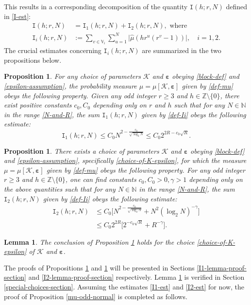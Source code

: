 \documentclass[12pt, twoside]{article}
\newtheorem{lemma}[theorem]{Lemma}
\newtheorem{proposition}[theorem]{Proposition}
\theoremstyle{definition}
\numberwithin{equation}{section}
\begin{document}
This results in a corresponding decomposition of the quantity $\mathtt I(h;r, N)$ defined in \eqref{I-est}: 
\begin{align} 
\mathtt I(h; r, N) &= \mathtt I_1(h; r, N) + \mathtt I_2(h;r, N), \text{ where } \label{I-decomp} \\ 
\mathtt I_i(h;r, N) &:=  \sum_{v \in \mathbb V_i} \sum_{u=1}^{N}\bigl| \widehat{\mu}(hr^u(r^v-1)) \bigr|, \quad i=1,2. \label{def-Ii}
\end{align} 
The crucial estimates concerning $\mathtt I_i(h;r, N)$ are summarized in the two propositions below. 
\begin{proposition} \label{Ii-lemma-parta}
For any choice of parameters $\mathcal K$ and $\pmb{\varepsilon}$ obeying \eqref{block-def} and \eqref{epsilon-assumption}, the probability measure $\mu = \mu[\mathcal K, \pmb{\varepsilon}]$ given by \eqref{def-mu} obeys the following property. 
\vskip0.1in 
\noindent Given any odd integer $r \geq 3$ and $h \in \mathbb Z \setminus \{0\}$, there exist positive constants $c_0, C_0$ depending only on $r$ and $h$ such that for any $N \in \mathbb N$ in the range \eqref{N-and-R}, the sum $\mathtt I_1(h;r, N)$ given by \eqref{def-Ii} obeys the following estimate:  
\begin{equation} 
\mathtt I_1(h;r, N) \leq C_0 N^{2 - \frac{c_0}{\sqrt{\log_2 N}}} \leq C_0 2^{2R - c_0\sqrt{R}}. \label{I1-est}
\end{equation} 
\end{proposition} 
\begin{proposition} \label{Ii-lemma-partb}
There exists a choice of parameters $\mathcal K$ and $\pmb{\varepsilon}$ obeying \eqref{block-def} and \eqref{epsilon-assumption}, specifically \eqref{choice-of-K-epsilon}, for which the measure $\mu = \mu[\mathcal K, \pmb{\varepsilon}]$ given by \eqref{def-mu} obeys the following property.  
\vskip0.1in
\noindent For any odd integer $r \geq 3$ and  $h \in \mathbb Z \setminus \{0\}$, one can find constants $c_0, C_0 > 0, \gamma > 1$ depending only on the above quantities such that for any $N \in \mathbb N$ in the range \eqref{N-and-R}, the sum $\mathtt I_2(h;r, N)$ given by \eqref{def-Ii} obeys the following estimate:  
\begin{align}
\mathtt I_2(h;r, N) &\leq C_0 \bigl[  N^{2- \frac{c_0}{\sqrt{\log_2 N}}} + N^{2} (\log_2 N)^{-\gamma} \bigr] \nonumber \\ 
&\leq C_0 2^{2R} \bigl[2^{- c_0 \sqrt{R}} + R^{-\gamma} \bigr]. \label{I2-est} 
\end{align}  
\end{proposition} 
\begin{lemma} \label{special-choices-lemma}
The conclusion of Proposition \ref{Ii-lemma-partb} holds for the choice \eqref{choice-of-K-epsilon} of $\mathcal K$ and $\pmb{\varepsilon}$.  
\end{lemma} 
\noindent The proofs of Propositions \ref{Ii-lemma-parta} and \ref{Ii-lemma-partb} will be presented in Sections \ref{I1-lemma-proof-section} and \ref{I2-lemma-proof-section} respectively. Lemma \ref{special-choices-lemma} is verified in Section \ref{special-choices-section}. Assuming the estimates \eqref{I1-est} and \eqref{I2-est} for now, the proof of Proposition \ref{mu-odd-normal} is completed as follows. 
\end{document}
